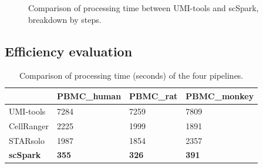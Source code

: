 \documentclass[conference]{IEEEtran}
\begin{document}
\begin{figure}
	\centering
	\caption{Comparison of processing time between UMI-tools and scSpark, breakdown by steps.}
	\label{fig2}
\end{figure}

\subsection{Efficiency evaluation}

\begin{table}
	\centering
	\caption{Comparison of processing time (seconds) of the four pipelines.}\label{tab1}
	\begin{tabular}{l | l | l | l }
		\hline
		 & PBMC\_human & PBMC\_rat & PBMC\_monkey \\ 
		\hline
		UMI-tools & 7284 & 7259 & 7809 \\
		CellRanger & 2225 & 1999 & 1891 \\
		STARsolo & 1987 & 1854 & 2357 \\
		\textbf{scSpark} & \textbf{355} & \textbf{326} & \textbf{391} \\
		\hline
	\end{tabular}
\end{table}
\end{document}
